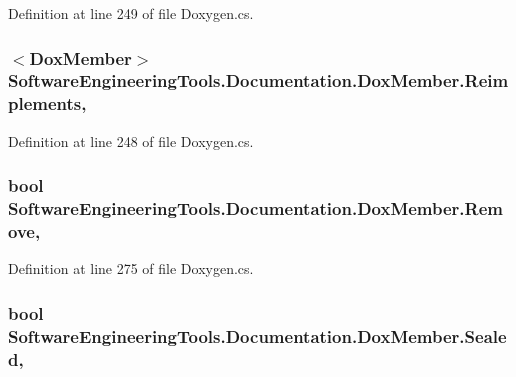 Definition at line 249 of file Doxygen.\+cs.

\hypertarget{class_software_engineering_tools_1_1_documentation_1_1_dox_member_aa37bc34ea6508dbfe714f3ab07bff7ef}{
\subsubsection[{Reimplements}]{$<${\bf Dox\+Member}$>$ Software\+Engineering\+Tools.\+Documentation.\+Dox\+Member.\+Reimplements\hspace{0.3cm}{\ttfamily [get]}, {\ttfamily [set]}}}\label{class_software_engineering_tools_1_1_documentation_1_1_dox_member_aa37bc34ea6508dbfe714f3ab07bff7ef}


Definition at line 248 of file Doxygen.\+cs.

\hypertarget{class_software_engineering_tools_1_1_documentation_1_1_dox_member_ac7a045bbb7c9e46cf9d05d33ddba4d7b}{
\subsubsection[{Remove}]{\setlength{\rightskip}{0pt plus 5cm}bool Software\+Engineering\+Tools.\+Documentation.\+Dox\+Member.\+Remove\hspace{0.3cm}{\ttfamily [get]}, {\ttfamily [set]}}}\label{class_software_engineering_tools_1_1_documentation_1_1_dox_member_ac7a045bbb7c9e46cf9d05d33ddba4d7b}


Definition at line 275 of file Doxygen.\+cs.

\hypertarget{class_software_engineering_tools_1_1_documentation_1_1_dox_member_af4888e13a3903de283573176fff0456f}{
\subsubsection[{Sealed}]{\setlength{\rightskip}{0pt plus 5cm}bool Software\+Engineering\+Tools.\+Documentation.\+Dox\+Member.\+Sealed\hspace{0.3cm}{\ttfamily [get]}, {\ttfamily [set]}}}\label{class_software_engineering_tools_1_1_documentation_1_1_dox_member_af4888e13a3903de283573176fff0456f}


